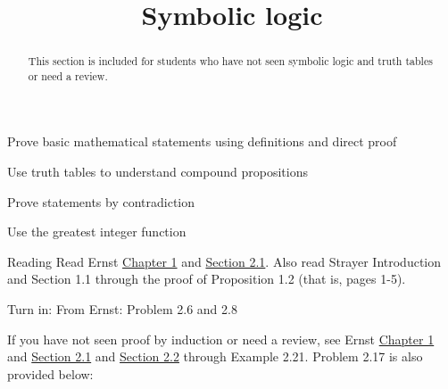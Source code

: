 \documentclass{ximera}
\title{Symbolic logic}
\begin{document}
\begin{abstract}
  This section is included for students who have not seen symbolic logic and truth tables or need a review.
\end{abstract}
\maketitle


\begin{obj}
  \item Prove basic mathematical statements using definitions and direct proof
  \item Use truth tables to understand compound propositions
  \item Prove statements by contradiction
  \item Use the greatest integer function
\end{obj}
 

\begin{instructorNotes}
  \begin{pre}
    \item[Reading]  Read Ernst  \href{https://danaernst.com/IBL-IntroToProof/pretext/chap_intro.html}{Chapter 1} and \href{https://danaernst.com/IBL-IntroToProof/pretext/sec_baby_number_theory.html}{Section 2.1}. Also read Strayer Introduction and Section 1.1 through the proof of Proposition 1.2 (that is, pages 1-5).
  
    \item[Turn in:] From Ernst: Problem 2.6 and 2.8
  \end{pre}
\end{instructorNotes}


If you have not seen proof by induction or need a review, see Ernst  \href{https://danaernst.com/IBL-IntroToProof/pretext/chap_intro.html}{Chapter 1} and \href{https://danaernst.com/IBL-IntroToProof/pretext/sec_baby_number_theory.html}{Section 2.1}
and \href{https://danaernst.com/IBL-IntroToProof/pretext/sec_Intro_to_Logic.html}{Section 2.2} through Example 2.21. Problem 2.17 is also provided below:
\end{document}

